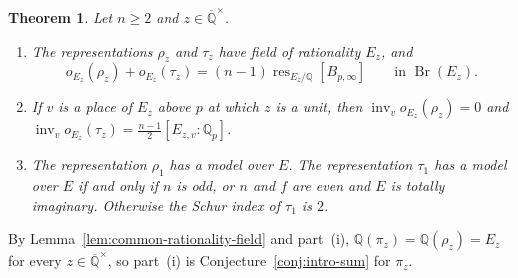 \documentclass[a4paper,11pt]{amsart}
\newtheorem{introtheorem}{Theorem}
\theoremstyle{definition}
\theoremstyle{remark}
\numberwithin{equation}{section}
\newcommand{\Q}{\mathbb{Q}}
\DeclareMathOperator{\Br}{Br}
\DeclareMathOperator{\inv}{inv}
\DeclareMathOperator{\res}{res}
\newcommand{\Qbar}{\overline{\mathbb{Q}}}
\newcommand{\Bpinf}{B_{p,\infty}}
\begin{document}
\begin{introtheorem}\label{thm:intro-depth-zero}
Let $n\ge2$ and $z\in\Qbar^\times$.
\begin{enumerate}
\item[(i)] The representations $\rho_z$ and $\tau_z$ have field of rationality $E_z$, and
\[
 o_{E_z}(\rho_z)+o_{E_z}(\tau_z)=(n-1)\res_{E_z/\Q}[\Bpinf] \qquad\text{in }\Br(E_z).
\]
\item[(ii)] If $v$ is a place of $E_z$ above $p$ at which $z$ is a unit, then $\inv_vo_{E_z}(\rho_z)=0$ and $\inv_vo_{E_z}(\tau_z)=\frac{n-1}2[E_{z,v}:\Q_p]$.
\item[(iii)] The representation $\rho_1$ has a model over $E$. The representation $\tau_1$ has a model over $E$ if and only if $n$ is odd, or $n$ and $f$ are even and $E$ is totally imaginary. Otherwise the Schur index of $\tau_1$ is $2$.
\end{enumerate}
\end{introtheorem}

By Lemma~\ref{lem:common-rationality-field} and part~(i), $\Q(\pi_z)=\Q(\rho_z)=E_z$ for every $z\in\Qbar^\times$, so part~(i) is Conjecture~\ref{conj:intro-sum} for $\pi_z$.
\end{document}
